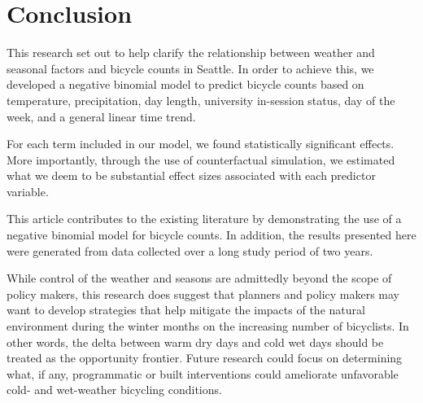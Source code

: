 \documentclass[12pt,letterpaper,article,twocolumn]{memoir}
\begin{document}
\section*{Conclusion}
This research set out to help clarify the relationship between weather
and seasonal factors and bicycle counts in Seattle. In order to
achieve this, we developed a negative binomial model to predict
bicycle counts based on temperature, precipitation, day length,
university in-session status, day of the week, and a general linear
time trend.

For each term included in our model, we found statistically
significant effects. More importantly, through the use of
counterfactual simulation, we estimated what we deem to be substantial
effect sizes associated with each predictor variable.

This article contributes to the existing literature by demonstrating
the use of a negative binomial model for bicycle counts. In addition,
the results presented here were generated from data collected over a
long study period of two years.

While control of the weather and seasons are admittedly beyond the
scope of policy makers, this research does suggest that planners and
policy makers may want to develop strategies that help mitigate the
impacts of the natural environment during the winter months on the
increasing number of bicyclists. In other words, the delta between
warm dry days and cold wet days should be treated as the opportunity
frontier. Future research could focus on determining what, if any,
programmatic or built interventions could ameliorate unfavorable cold-
and wet-weather bicycling conditions.

\printbibliography
\end{document}
